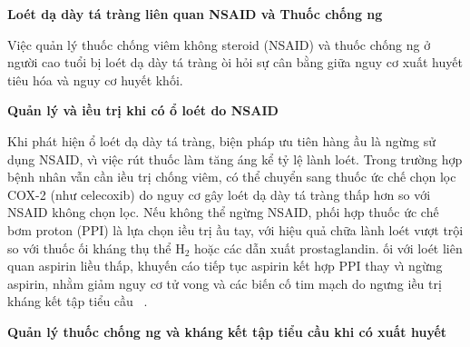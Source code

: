 \documentclass[9pt,twocolumn]{article}
\begin{document}
\textbf{Lo{\'e}t d{\d{a}} d\`{a}y t\'{a} tr\`{a}ng li{\^{e}}n quan NSAID v\`{a} Thuốc chống ng}

Vi{\^{\d{e}}}c quản l\'{y} thuốc chống vi{\^{e}}m kh{\^o}ng steroid (NSAID) v\`{a} thuốc chống ng ở người cao tuổi b\d{i} lo{\'e}t d{\d{a}} d\`{a}y t\'{a} tr\`{a}ng \text{\dj}\`{o}i hỏi sự c\^{a}n bằng giữa nguy cơ xuất huy{{\'{\^{e}}}}t ti{\^{e}}u h{\'{o}}a v\`{a} nguy cơ huy{{\'{\^{e}}}}t khối. 

\textbf{Quản l\'{y} v\`{a} \text{\dj}iều tr\d{i} khi c{\'{o}} ổ lo{\'e}t do NSAID}

Khi ph\'{a}t hi{\^{\d{e}}}n ổ lo{\'e}t d{\d{a}} d\`{a}y t\'{a} tr\`{a}ng, bi{\^{\d{e}}}n ph\'{a}p ưu ti{\^{e}}n h\`{a}ng \text{\dj}ầu l\`{a} ngừng sử d\d{u}ng NSAID, v\`{\i} vi{\^{\d{e}}}c r\'{u}t thuốc l\`{a}m t{\u{a}}ng \text{\dj}\'{a}ng kể tỷ l{\^{\d{e}}} l\`{a}nh lo{\'e}t. Trong trường hợp b{\^{\d{e}}}nh nh\^{a}n vẫn cần \text{\dj}iều tr\d{i} chống vi{\^{e}}m, c{\'{o}} thể chuyển sang thuốc ức ch{{\'{\^{e}}}} ch\d{o}n l\d{o}c COX-2 (như celecoxib) do nguy cơ g\^{a}y lo{\'e}t d{\d{a}} d\`{a}y t\'{a} tr\`{a}ng thấp hơn so với NSAID kh{\^o}ng ch\d{o}n l\d{o}c. N{{\'{\^{e}}}}u kh{\^o}ng thể ngừng NSAID, phối hợp thuốc ức ch{{\'{\^{e}}}} bơm proton (PPI) l\`{a} lựa ch\d{o}n \text{\dj}iều tr\d{i} \text{\dj}ầu tay, với hi{\^{\d{e}}}u quả chữa l\`{a}nh lo{\'e}t vượt tr{\^{\d{o}}}i so với thuốc \text{\dj}ối kh\'{a}ng th\d{u} thể H\ensuremath{_{2}} hoặc c\'{a}c dẫn xuất prostaglandin. \text{\DJ}ối với lo{\'e}t li{\^{e}}n quan aspirin liều thấp, khuy{{\'{\^{e}}}}n c\'{a}o ti{{\'{\^{e}}}}p t\d{u}c aspirin k{{\'{\^{e}}}}t hợp PPI thay v\`{\i} ngừng aspirin, nhằm giảm nguy cơ tử vong v\`{a} c\'{a}c bi{{\'{\^{e}}}}n cố tim m{\d{a}}ch do ngưng \text{\dj}iều tr\d{i} kh\'{a}ng k{{\'{\^{e}}}}t t{\^{\d{a}}}p tiểu cầu\unskip~\cite{2901310:34531813,2901310:34531814} .

\textbf{Quản l\'{y} thuốc chống ng v\`{a} kh\'{a}ng k{{\'{\^{e}}}}t t{\^{\d{a}}}p tiểu cầu khi c{\'{o}} xuất huy{{\'{\^{e}}}}t}
\end{document}
